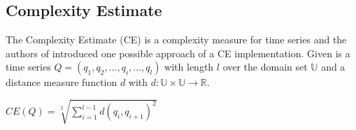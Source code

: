 \subsection{Complexity Estimate} \label{complexity_estimate}
The Complexity Estimate (CE) is a complexity measure for time series and the authors of \cite{batista2011complexity}
introduced one possible approach of a CE implementation. Given is a time series $Q = (q_1, q_2, \dots, q_i, \dots, q_l)$
with length $l$ over the domain set $\mathbb{U}$ and a distance measure function $d$ with
$d: \mathbb{U} \times \mathbb{U} \to \mathbb{R}$.
\begin{center}
    $CE(Q) = \sqrt[2]{\sum \limits_{i=1}^{l-1} d(q_i, q_{i + 1})^2}$
\end{center}
